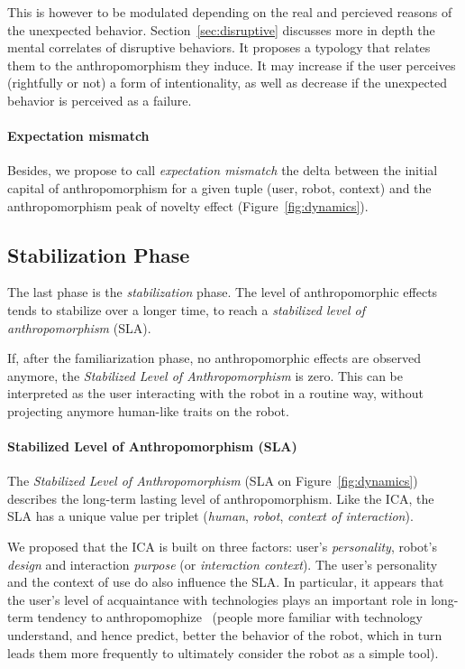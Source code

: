\documentclass{frontiersSCNS} %
\begin{document}
This is however to be modulated depending on the real and percieved reasons of the
unexpected behavior.  Section~\ref{sec:disruptive} discusses more in depth the
mental correlates of disruptive behaviors. It proposes a typology that relates
them to the anthropomorphism they induce. It may increase if the user perceives
(rightfully or not) a form of intentionality, as well as decrease if the
unexpected behavior is perceived as a failure.

\paragraph{Expectation mismatch}

Besides, we propose to call \emph{expectation mismatch} the delta between the
initial capital of anthropomorphism for a given tuple (user, robot, context)
and the anthropomorphism peak of novelty effect (Figure~\ref{fig:dynamics}).

\subsection{Stabilization Phase}
\label{sec:stabilization}

The last phase is the \emph{stabilization} phase. The level of anthropomorphic
effects tends to stabilize over a longer time, to reach a \emph{stabilized
level of anthropomorphism} (SLA).

If, after the familiarization phase, no anthropomorphic effects are observed
anymore, the \emph{Stabilized Level of Anthropomorphism} is zero. This can
be interpreted as the user interacting with the robot in a routine way, without
projecting anymore human-like traits on the robot.


\paragraph{Stabilized Level of Anthropomorphism (SLA)}

The \emph{Stabilized Level of Anthropomorphism} (SLA on
Figure~\ref{fig:dynamics}) describes the long-term lasting level of
anthropomorphism.  Like the ICA, the SLA has a unique value per triplet
(\emph{human}, \emph{robot}, \emph{context of interaction}).

We proposed that the ICA is built on three factors: user's \emph{personality},
robot's \emph{design} and interaction \emph{purpose} (or \emph{interaction
context}). The user's personality and the context of use do also influence the
SLA. In particular, it appears that the user's level of acquaintance with
technologies plays an important role in long-term tendency to
anthropomophize~\cite{fink_living_2013} (people more familiar with technology
understand, and hence predict, better the behavior of the robot, which in turn
leads them more frequently to ultimately consider the robot as a simple tool).
\end{document}
